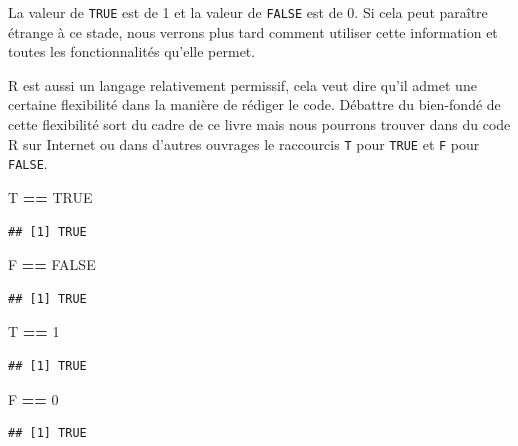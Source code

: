 \documentclass[
]{book}
\newenvironment{Shaded}{\begin{snugshade}}{\end{snugshade}}
\newcommand{\DecValTok}[1]{\textcolor[rgb]{0.00,0.00,0.81}{#1}}
\newcommand{\NormalTok}[1]{#1}
\newcommand{\OperatorTok}[1]{\textcolor[rgb]{0.81,0.36,0.00}{\textbf{#1}}}
\newcommand{\OtherTok}[1]{\textcolor[rgb]{0.56,0.35,0.01}{#1}}
\newcommand{\StringTok}[1]{\textcolor[rgb]{0.31,0.60,0.02}{#1}}
\begin{document}
La valeur de \texttt{TRUE} est de 1 et la valeur de \texttt{FALSE} est de 0. Si cela peut paraître étrange à ce stade, nous verrons plus tard comment utiliser cette information et toutes les fonctionnalités qu'elle permet.

R est aussi un langage relativement permissif, cela veut dire qu'il admet une certaine flexibilité dans la manière de rédiger le code. Débattre du bien-fondé de cette flexibilité sort du cadre de ce livre mais nous pourrons trouver dans du code R sur Internet ou dans d'autres ouvrages le raccourcis \texttt{T} pour \texttt{TRUE} et \texttt{F} pour \texttt{FALSE}.

\begin{Shaded}
\begin{Highlighting}[]
\NormalTok{T }\OperatorTok{==}\StringTok{ }\OtherTok{TRUE}
\end{Highlighting}
\end{Shaded}

\begin{verbatim}
## [1] TRUE
\end{verbatim}

\begin{Shaded}
\begin{Highlighting}[]
\NormalTok{F }\OperatorTok{==}\StringTok{ }\OtherTok{FALSE}
\end{Highlighting}
\end{Shaded}

\begin{verbatim}
## [1] TRUE
\end{verbatim}

\begin{Shaded}
\begin{Highlighting}[]
\NormalTok{T }\OperatorTok{==}\StringTok{ }\DecValTok{1}
\end{Highlighting}
\end{Shaded}

\begin{verbatim}
## [1] TRUE
\end{verbatim}

\begin{Shaded}
\begin{Highlighting}[]
\NormalTok{F }\OperatorTok{==}\StringTok{ }\DecValTok{0}
\end{Highlighting}
\end{Shaded}

\begin{verbatim}
## [1] TRUE
\end{verbatim}
\end{document}
